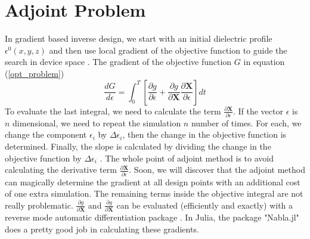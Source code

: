 \documentclass{tufte-handout}
\begin{document}
 \section{Adjoint Problem}
 In gradient based inverse design, we start with an initial dielectric profile $\epsilon^{0}(x,y,z)$  and then use local  gradient of the objective function to guide the search in device space . The gradient of the objective function $G$ in equation (\ref{opt_problem})
 \begin{equation}
 \frac{d G}{d\epsilon} = \int_{0}^{T} \left[  \frac{\partial g}{\partial \epsilon} +  \frac{\partial g}{\partial \mathbf{X}} \frac{\partial \mathbf{X}}{\partial \epsilon}\right] dt
 \end{equation}
 To evaluate the last integral, we need to calculate the term $ \frac{\partial \mathbf{X}}{\partial \epsilon}$. If the vector $\epsilon$ is $n$ dimensional, we need to repeat the simulation $n$ number of times. For each, we change the component $\epsilon_i$ by $\Delta \epsilon_i$, then the change in the objective function is determined. Finally, the slope is calculated by dividing the change in the objective function by $\Delta \epsilon_i$ . The whole point of adjoint method is to avoid calculating the derivative term $ \frac{\partial \mathbf{X}}{\partial \epsilon}$. Soon, we will discover that the adjoint method can magically determine the gradient at all design points with an additional cost of one extra simulation. The remaining terms inside the objective integral are not really problematic. $\frac{\partial g}{\partial \mathbf{X}}$ and $\frac{\partial g}{\partial \mathbf{X}}$ can be evaluated (efficiently and exactly) with a reverse mode  automatic differentiation package . In Julia, the package "Nabla.jl" does a pretty good job in calculating these gradients.
 
\end{document}
